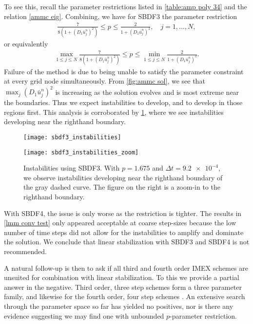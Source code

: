 To see this, recall the parameter restrictions listed in \cref{table:amp poly 34} and the relation \cref{ammc eig}. Combining, we have for SBDF3 the parameter restriction
\begin{align}
        \frac{7}{8(1 + (D_1\bar u^n_j)^2)} \leq p \leq \frac{2}{1 + (D_1 \bar u^n_j)^2},
\quad j=1,\dots,N,
\end{align}
or equivalently
\begin{align} 
\max_{1\leq j\leq N}\frac{7}{8(1 + (D_1\bar u^n_j)^2)} \leq p 
\leq \min_{1\leq j\leq N}\frac{2}{1 + (D_1 \bar u^n_j)^2}.
\end{align}
Failure of the method is due to being unable to satisfy the parameter constraint at every grid node simultaneously. From \cref{fig:ammc sol}, we see that $\max_j (D_1 \bar u^n_j)^2$ is increasing as the solution evolves and is most extreme near the boundaries. Thus we expect instabilities to develop, and to develop in those regions first. This analysis is corroborated by \cref{fig:sbdf3 instab}, where we see instabilities developing near the righthand boundary.
\begin{figure}[htb!]
        \centering
\begin{minipage}{0.45\textwidth}
       \texttt{[image: sbdf3\_instabilities]}
\end{minipage}
\begin{minipage}{0.45\textwidth}
       \texttt{[image: sbdf3\_instabilities\_zoom]}
\end{minipage}
\caption[Instabilities using SBDF3.]{Instabilities using SBDF3. With $p=1.675$ and $\Delta t=\num{9.2e-4}$, we observe instabilities developing near the righthand boundary of the gray dashed curve. The figure on the right is a zoom-in to the righthand boundary.}
\label{fig:sbdf3 instab}
\end{figure}

With SBDF4, the issue is only worse as the restriction is tighter. The results in \cref{lmm conv test} only appeared acceptable at coarse step-sizes because the low number of time steps did not allow for the instabilities to amplify and dominate the solution. We conclude that linear stabilization with SBDF3 and SBDF4  is not recommended. 

A natural follow-up is then to ask if all third and fourth order IMEX schemes are unsuited for combination with linear stabilization. To this we provide a partial answer in the negative. Third order, three step schemes form a three parameter family, and likewise for the fourth order, four step schemes \cite{ascher1995implicit}. An extensive search through the parameter space so far has yielded no positives, nor is there any evidence suggesting we may find one with unbounded $p$-parameter restriction.

